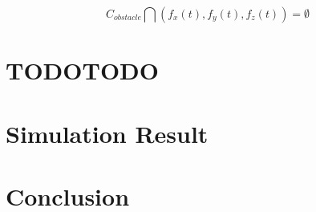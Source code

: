 \documentclass{jarticle}
\begin{document}
\begin{equation}
  \label{eq:temp7}
  C_{obstacle}\bigcap (f_x(t), f_y(t), f_z(t)) =\emptyset
\end{equation}


\section{TODOTODO}

\section{Simulation Result}


\section{Conclusion}


{\footnotesize


}
\end{document}
